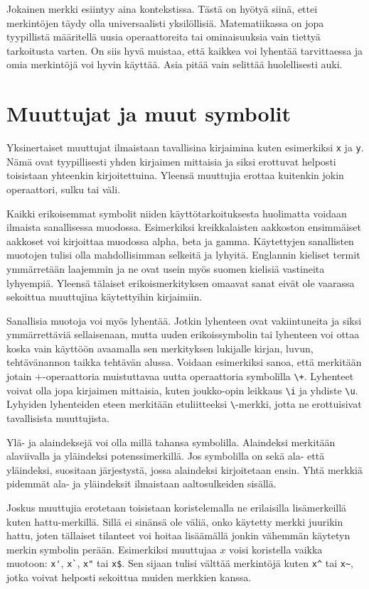 Jokainen merkki esiintyy aina kontekstissa. Tästä on hyötyä siinä, ettei merkintöjen täydy olla universaalisti yksilöllisiä. Matematiikassa on jopa tyypillistä 
määritellä uusia operaattoreita tai ominaisuuksia vain tiettyä tarkoitusta varten. On siis hyvä muistaa, että kaikkea voi lyhentää tarvittaessa ja omia merkintöjä 
voi hyvin käyttää. Asia pitää vain selittää huolellisesti auki.

\section{Muuttujat ja muut symbolit}
Yksinertaiset muuttujat ilmaistaan tavallisina kirjaimina kuten esimerkiksi \verb$x$ ja \verb$y$.
Nämä ovat tyypillisesti yhden kirjaimen mittaisia ja siksi erottuvat helposti toisistaan yhteenkin kirjoitettuina.
Yleensä muuttujia erottaa kuitenkin jokin operaattori, sulku tai väli.

Kaikki erikoisemmat symbolit niiden käyttötarkoituksesta huolimatta voidaan ilmaista sanallisessa muodossa.
Esimerkiksi kreikkalaisten aakkoston ensimmäiset aakkoset voi kirjoittaa muodossa alpha, beta ja gamma.
Käytettyjen sanallisten muotojen tulisi olla mahdollisimman selkeitä ja lyhyitä.
Englannin kieliset termit ymmärretään laajemmin ja ne ovat usein myös suomen kielisiä vastineita lyhyempiä.
Yleensä tälaiset erikoismerkityksen omaavat sanat eivät ole vaarassa sekoittua muuttujina käytettyihin kirjaimiin.

Sanallisia muotoja voi myös lyhentää.
Jotkin lyhenteen ovat vakiintuneita ja siksi ymmärrettäviä sellaisenaan,
mutta uuden erikoissymbolin tai lyhenteen voi ottaa koska vain käyttöön avaamalla sen merkityksen lukijalle kirjan, luvun, tehtävänannon taikka tehtävän alussa.
Voidaan esimerkiksi sanoa, että merkitään jotain $+$-operaattoria muistuttavaa uutta operaattoria symbolilla \verb$\+$.
Lyhenteet voivat olla jopa kirjaimen mittaisia, kuten joukko-opin leikkaus \verb$\i$ ja yhdiste \verb$\u$.
Lyhyiden lyhenteiden eteen merkitään etuliitteeksi \verb$\$-merkki, jotta ne erottuisivat tavallisista muuttujista.

Ylä- ja alaindeksejä voi olla millä tahansa symbolilla.
Alaindeksi merkitään alaviivalla ja yläindeksi potenssimerkillä.
Jos symbolilla on sekä ala- että yläindeksi, suositaan järjestystä, jossa alaindeksi kirjoitetaan ensin.
Yhtä merkkiä pidemmät ala- ja yläindeksit ilmaistaan aaltosulkeiden sisällä.

Joskus muuttujia erotetaan toisistaan koristelemalla ne erilaisilla lisämerkeillä kuten hattu-merkillä.
Sillä ei sinänsä ole väliä, onko käytetty merkki juurikin hattu, joten
tällaiset tilanteet voi hoitaa lisäämällä jonkin vähemmän käytetyn merkin symbolin perään.
Esimerkiksi muuttujaa $x$ voisi koristella vaikka muotoon: \verb$x'$, \verb$x`$, \verb$x"$ tai \verb!x$!.
Sen sijaan tulisi välttää merkintöjä kuten \verb$x^$ tai \verb$x~$, jotka voivat helposti sekoittua muiden merkkien kanssa.

